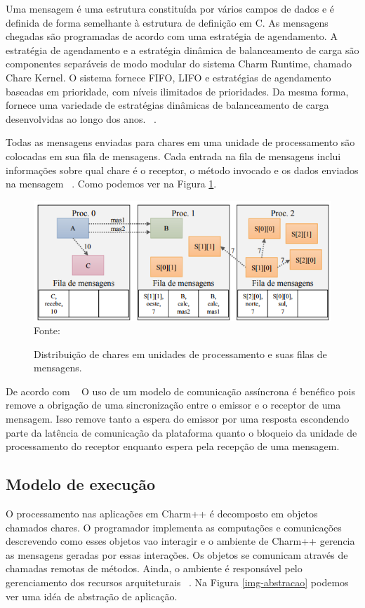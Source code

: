 Uma mensagem é uma estrutura constituída por vários campos de dados e é definida de forma semelhante à estrutura de definição em C. As mensagens chegadas são programadas de acordo com uma estratégia de agendamento. A estratégia de agendamento e a estratégia dinâmica de balanceamento de carga são componentes separáveis de modo modular do sistema Charm Runtime, chamado Chare Kernel. O sistema fornece FIFO, LIFO e estratégias de agendamento baseadas em prioridade, com níveis ilimitados de prioridades. Da mesma forma, fornece uma variedade de estratégias dinâmicas de balanceamento de carga desenvolvidas ao longo dos anos. ~\cite{kale1993parallel2}.

Todas as mensagens enviadas para chares em uma unidade de processamento são colocadas em sua fila de mensagens. Cada entrada na fila de mensagens inclui informações sobre qual chare é o receptor, o método invocado e os dados enviados na mensagem ~\cite[p.32]{pilla2015programaccao2}. Como podemos ver na Figura \ref{img-message}. 

\begin{figure}[!htb]
	\centering
	\caption{Distribuição de chares em unidades de processamento e suas filas de mensagens.}
	\includegraphics[scale=0.80]{figuras/message.png}
	\label{img-message}
	Fonte: \cite[p.32]{pilla2015programaccao2}
\end{figure}
 
 
 De acordo com ~\cite[p.30]{pilla2015programaccao2} O uso de um modelo de comunicação assíncrona é benéfico pois remove a obrigação de uma sincronização entre o emissor e o receptor de uma mensagem. Isso remove tanto a espera do emissor por uma resposta escondendo parte da latência de comunicação da plataforma quanto o bloqueio da unidade de processamento do receptor enquanto espera pela recepção de uma mensagem.
 
 \subsection{Modelo de execução}
 O processamento nas aplicações em Charm++ é decomposto em objetos chamados chares. O programador implementa as computações e comunicações descrevendo como esses objetos vao interagir e o ambiente de Charm++ gerencia as mensagens geradas por essas interações. Os objetos se comunicam através de chamadas remotas de métodos. Ainda, o ambiente é responsável pelo gerenciamento dos recursos arquiteturais ~\cite{pillaNatalRN}. Na Figura \ref{img-abstracao} podemos ver uma idéa de abstração de aplicação.
 
